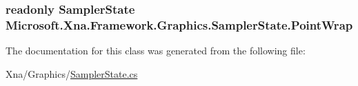 \subsubsection[{Point\+Wrap}]{\setlength{\rightskip}{0pt plus 5cm}readonly {\bf Sampler\+State} Microsoft.\+Xna.\+Framework.\+Graphics.\+Sampler\+State.\+Point\+Wrap\hspace{0.3cm}{\ttfamily [static]}}\label{class_microsoft_1_1_xna_1_1_framework_1_1_graphics_1_1_sampler_state_a7f67a63457b86bab7d49285c4d790970}


The documentation for this class was generated from the following file\+:\begin{DoxyCompactItemize}
\item 
Xna/\+Graphics/\hyperlink{_sampler_state_8cs}{Sampler\+State.\+cs}\end{DoxyCompactItemize}
